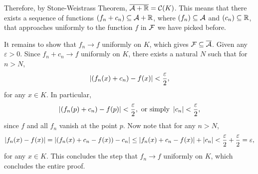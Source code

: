 \documentclass[12pt]{article}
\begin{document}
\begin{fproof}[4]
Therefore, by Stone-Weistrass Theorem, \(\overline{\mathcal{A} + \mathbb {R}} = \mathcal{C}(K)\). This means that there exists a sequence of functions \((f_n + c_n) \subseteq \mathcal{A} + \mathbb {R}\), where \((f_n) \subseteq \mathcal{A}\) and \((c_n) \subseteq \mathbb {R}\), that approaches uniformly to the function \(f\) in \(\mathcal{F}\) we have picked before.

It remains to show that \(f_n \to f\) uniformly on \(K\), which gives \(\mathcal{F} \subseteq \overline{\mathcal{A}}\).
Given any \(\varepsilon > 0\).
Since \(f_n + c_n \to f\) uniformly on \(K\), there exists a natural \(N\) such that for \(n > N\),
\begin{align*}
    \left\lvert (f_n(x) + c_n) - f(x) \right\rvert < \frac{\varepsilon}{2},
\end{align*}
for any \(x \in K\).
In particular,
\begin{align*}
    \left\lvert (f_n(p) + c_n) - f(p) \right\rvert < \frac{\varepsilon}{2}, \text{ or simply } \left\lvert c_n \right\rvert < \frac{\varepsilon}{2},
\end{align*}
since \(f\) and all \(f_n\) vanish at the point \(p\).
Now note that for any \(n > N\),
\begin{align*}
    \left\lvert f_n(x) - f(x) \right\rvert = \left\lvert (f_n(x) + c_n - f(x)) - c_n \right\rvert \leq \left\lvert f_n(x) + c_n - f(x) \right\rvert + \left\lvert c_n \right\rvert < \frac{\varepsilon}{2} + \frac{\varepsilon}{2} = \varepsilon,
\end{align*}
for any \(x \in K\).
This concludes the step that \(f_n \to f\) uniformly on \(K\), which concludes the entire proof.
\end{fproof}
\newpage
\end{document}
